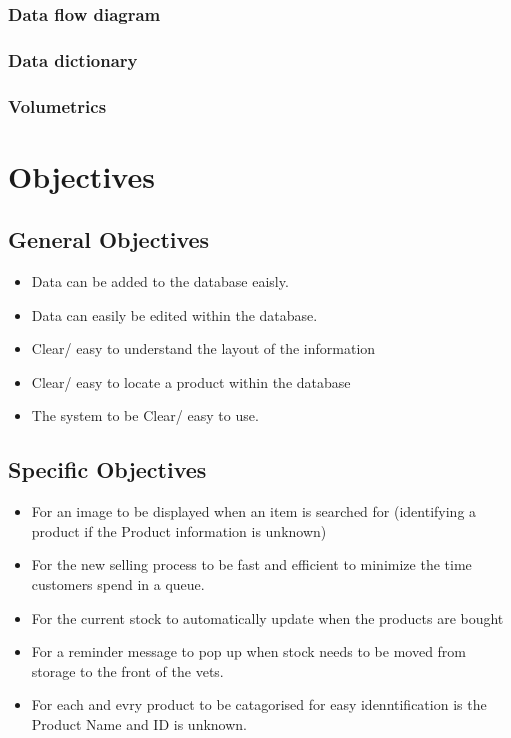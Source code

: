\subsubsection{Data flow diagram}

\subsubsection{Data dictionary}

\subsubsection{Volumetrics}

\section{Objectives}

\subsection{General Objectives}

 \begin{flushleft}
 \begin{itemize}
	\item Data can be added to the database eaisly.
	\item Data can easily be edited within the database.
	\item Clear/ easy to understand the layout of the information
	\item  Clear/ easy to locate a product within the database
	\item The system to be Clear/ easy to use.
\end{itemize}
\end{flushleft}	


\subsection{Specific Objectives}

\begin{flushleft}
\begin{itemize}
	\item For an image to be displayed when an item is searched for (identifying a product if the Product information is unknown)
	\item For the new selling process to be fast and efficient to minimize the time customers spend in a queue.
	\item For the current stock to automatically update when the products are bought
	\item For a reminder message to pop up when stock needs to be moved from storage to the front of the vets. 
	\item For each and evry product to be catagorised for easy idenntification is the Product Name and ID is unknown.
\end{itemize}
\end{flushleft}

